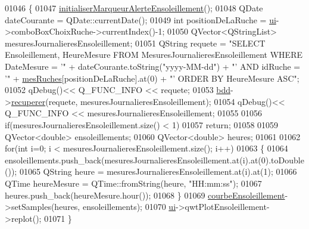 \begin{DoxyCode}
01046 \{
01047     \hyperlink{class_ruche_ihm_a6d52dd904573d1bfc9551421ab53e8cc}{initialiserMarqueurAlerteEnsoleillement}();
01048     QDate dateCourante = QDate::currentDate();
01049     \textcolor{keywordtype}{int} positionDeLaRuche = \hyperlink{class_ruche_ihm_a64786058bd7f88ca2f1e9743bb27c25b}{ui}->comboBoxChoixRuche->currentIndex()-1;
01050     QVector<QStringList> mesuresJournalieresEnsoleillement;
01051     QString requete = \textcolor{stringliteral}{"SELECT Ensoleillement, HeureMesure FROM MesuresJournalieresEnsoleillement WHERE
       DateMesure = '"} + dateCourante.toString(\textcolor{stringliteral}{"yyyy-MM-dd"}) + \textcolor{stringliteral}{"' AND idRuche = '"} + 
      \hyperlink{class_ruche_ihm_ab7741fa67b19cbb2da7eb12c58cf83c1}{mesRuches}[positionDeLaRuche].at(0) + \textcolor{stringliteral}{"' ORDER BY HeureMesure ASC"};
01052     qDebug()<< Q\_FUNC\_INFO << requete;
01053     \hyperlink{class_ruche_ihm_a0851936fe212e8d40538264f09749153}{bdd}->\hyperlink{class_base_de_donnees_a77539baad389f5acf754cd2cd452403e}{recuperer}(requete, mesuresJournalieresEnsoleillement);
01054     qDebug()<< Q\_FUNC\_INFO << mesuresJournalieresEnsoleillement;
01055 
01056     \textcolor{keywordflow}{if}(mesuresJournalieresEnsoleillement.size() < 1)
01057         \textcolor{keywordflow}{return};
01058 
01059     QVector<double> ensoleillements;
01060     QVector<double> heures;
01061 
01062     \textcolor{keywordflow}{for}(\textcolor{keywordtype}{int} i=0; i < mesuresJournalieresEnsoleillement.size(); i++)
01063     \{
01064         ensoleillements.push\_back(mesuresJournalieresEnsoleillement.at(i).at(0).toDouble());
01065         QString heure = mesuresJournalieresEnsoleillement.at(i).at(1);
01066         QTime heureMesure = QTime::fromString(heure, \textcolor{stringliteral}{"HH:mm:ss"});
01067         heures.push\_back(heureMesure.hour());
01068     \}
01069     \hyperlink{class_ruche_ihm_af160181f408b3a9519b97e67c810a0fd}{courbeEnsoleillement}->setSamples(heures, ensoleillements);
01070     \hyperlink{class_ruche_ihm_a64786058bd7f88ca2f1e9743bb27c25b}{ui}->qwtPlotEnsoleillement->replot();
01071 \}
\end{DoxyCode}
\mbox{\label{class_ruche_ihm_a5ee5942435915ca134765f42ff4b9061}} 

